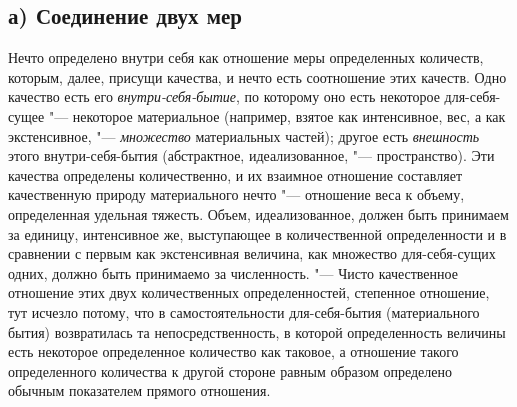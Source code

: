 \subsection[а) Соединение двух мер]{а) Соединение двух мер}
Нечто определено внутри себя как отношение меры
определенных количеств, которым, далее, присущи качества, и нечто есть
соотношение этих качеств. Одно качество есть его
{\em внутри-себя-бытие}, по которому оно есть некоторое
для-себя-сущее "--- некоторое материальное (например, взятое как интенсивное,
вес, а как экстенсивное, "--- {\em множество} материальных
частей); другое есть {\em внешность} этого
внутри-себя-бытия (абстрактное, идеализованное, "--- пространство). Эти
качества определены количественно, и их взаимное отношение составляет
качественную природу материального нечто "--- отношение веса к объему,
определенная удельная тяжесть. Объем, идеализованное, должен быть принимаем
за единицу, интенсивное же, выступающее в количественной определенности и в
сравнении с первым как экстенсивная величина, как множество для-себя-сущих
одних, должно быть принимаемо за численность. "--- Чисто качественное
отношение этих двух количественных определенностей, степенное отношение,
тут исчезло потому, что в самостоятельности для-себя-бытия (материального
бытия) возвратилась та непосредственность, в которой определенность
величины есть некоторое определенное количество как таковое, а отношение
такого определенного количества к другой стороне равным образом определено
обычным показателем прямого отношения.

